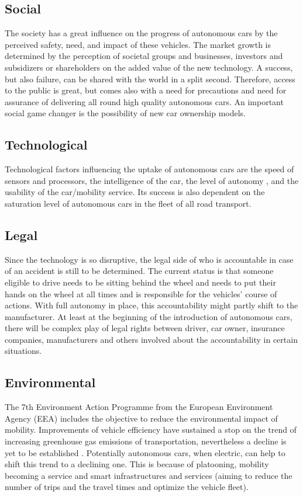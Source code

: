 \documentclass[a4paper]{article}
\begin{document}
\subsection{Social}
\label{sec:social}
The society has a great influence on the progress of autonomous cars by the perceived safety, need, and impact of these vehicles. The market growth is determined by the perception of societal groups and businesses, investors and subsidizers or shareholders on the added value of the new technology. A success, but also failure, can be shared with the world in a split second. Therefore, access to the public is great, but comes also with a need for precautions and need for assurance of delivering all round high quality autonomous cars. 
An important social game changer is the possibility of new car ownership models.

\subsection{Technological}
\label{sec:technological}
Technological factors influencing the uptake of autonomous cars are the speed of sensors and processors, the intelligence of the car, the level of autonomy \cite{KAUR201887}, and the usability of the car/mobility service. Its success is also dependent on the saturation level of autonomous cars in the fleet of all road transport.

\subsection{Legal}
\label{sec:not-gal}
Since the technology is so disruptive, the legal side of who is accountable in case of an accident is still to be determined. The current status is that someone eligible to drive needs to be sitting behind the wheel and needs to put their hands on the wheel at all times and is responsible for the vehicles' course of actions. With full autonomy in place, this accountability might partly shift to the manufacturer. At least at the beginning of the introduction of autonomous cars, there will be complex play of legal rights between driver, car owner, insurance companies, manufacturers and others involved about the accountability in certain situations.

\subsection{Environmental}
\label{sec:environmental}

The 7th Environment Action Programme from the European Environment Agency (EEA) includes the objective to reduce the environmental impact of mobility. Improvements of vehicle efficiency have sustained a stop on the trend of increasing greenhouse gas emissions of transportation, nevertheless a decline is yet to be established \cite{EEA}. Potentially autonomous cars, when electric, can help to shift this trend to a declining one. This is because of platooning, mobility becoming a service and smart infrastructures and services (aiming to reduce the number of trips and the travel times and optimize the vehicle fleet).
\end{document}
